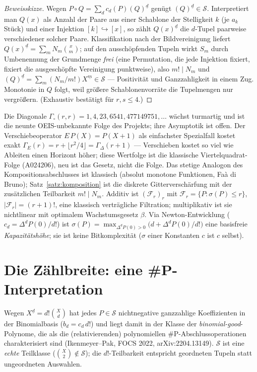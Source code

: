 \documentclass[11pt]{article}
\theoremstyle{definition}
\theoremstyle{remark}
\newcommand{\Struk}{\mathcal S}
\begin{document}
\begin{proof}[Beweisskizze]
Wegen $P\circ Q=\sum_d c_d(P)(Q)^{\underline d}$ genügt
$(Q)^{\underline d}\in\Struk$. Interpretiert man $Q(x)$ als Anzahl
der Paare aus einer Schablone der Stelligkeit $k$ (je $a_k$ Stück)
und einer Injektion $[k]\hookrightarrow[x]$, so zählt
$Q(x)^{\underline d}$ die $d$-Tupel paarweise verschiedener solcher
Paare. Klassifikation nach der Bildvereinigung liefert
$Q(x)^{\underline d}=\sum_m N_m\binom xm$; auf den ausschöpfenden
Tupeln wirkt $S_m$ durch Umbenennung der Grundmenge \emph{frei}
(eine Permutation, die jede Injektion fixiert, fixiert die
ausgeschöpfte Vereinigung punktweise), also $m!\mid N_m$ und
$(Q)^{\underline d}=\sum_m(N_m/m!)X^{\underline m}\in\Struk$ ---
Positivität und Ganzzahligkeit in einem Zug. Monotonie in $Q$ folgt,
weil größere Schablonenvorräte die Tupelmengen nur vergrößern.
(Exhaustiv bestätigt für $r,s\le4$.)
\end{proof}

Die Diagonale $\Gamma_\circ(r,r)=1,4,23,6541,477149751,\ldots$
wächst turmartig und ist die neunte OEIS-unbekannte Folge des
Projekts; ihre Asymptotik ist offen. Der Verschiebeoperator
$E\,P(X)=P(X{+}1)$ als einfachster Spezialfall kostet exakt
$\Gamma_E(r)=r+\lfloor r^2/4\rfloor=\Gamma_\Delta(r{+}1)$ ---
Verschieben kostet so viel wie Ableiten einen Horizont höher; diese
Wertfolge ist die klassische Viertelquadrat-Folge (A024206), neu ist
das Gesetz, nicht die Folge. Das stetige Analogon des
Kompositionsabschlusses ist klassisch (absolut monotone Funktionen,
Faà di Bruno); Satz~\ref{satz:komposition} ist die diskrete
Gitterverschärfung mit der zusätzlichen Teilbarkeit $m!\mid N_m$. Additiv ist
$(\mathcal F_r)_r$ mit $\mathcal F_r=\{P:\sigma(P)\le r\}$,
$|\mathcal F_r|=(r{+}1)!$, eine klassisch verträgliche Filtration;
multiplikativ ist sie nichtlinear mit optimalem Wachstumsgesetz
$\beta$. Via Newton-Entwicklung ($c_d=\Delta^dP(0)/d!$) ist
$\sigma(P)=\max_{\Delta^dP(0)>0}\bigl(d+\Delta^dP(0)/d!\bigr)$ eine
basisfreie \emph{Kapazitätshöhe}; sie ist keine Bitkomplexität
($\sigma$ einer Konstanten $c$ ist $c$ selbst).

\section{Die Zählbreite: eine \#P-Interpretation}

Wegen $X^{\underline d}=d!\binom Xd$ hat jedes $P\in\Struk$
nichtnegative ganzzahlige Koeffizienten in der Binomialbasis
($b_d=c_d\,d!$) und liegt damit in der Klasse der
\emph{binomial-good}-Polynome, die als die (relativierenden)
polynomiellen \#P-Abschlussoperationen charakterisiert sind
(Ikenmeyer--Pak, FOCS 2022, arXiv:2204.13149). $\Struk$ ist eine
\emph{echte} Teilklasse ($\binom X2\notin\Struk$); die
$d!$-Teilbarkeit entspricht geordneten Tupeln statt ungeordneten
Auswahlen.
\end{document}
